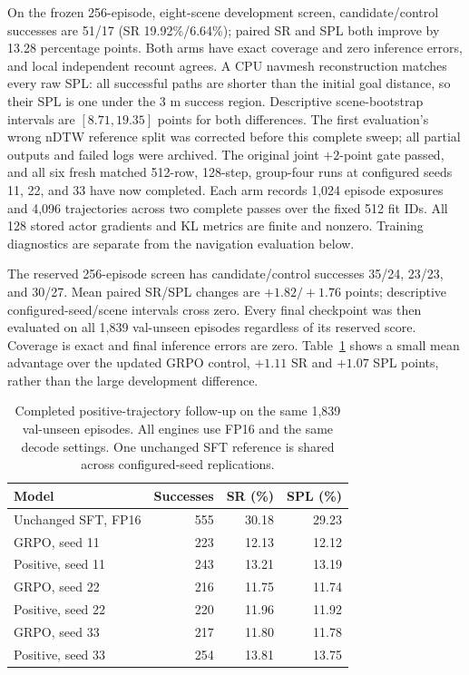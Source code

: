 \documentclass[10pt,twocolumn,letterpaper]{article}
\begin{document}
On the frozen 256-episode, eight-scene development screen, candidate/control
successes are 51/17 (SR 19.92\%/6.64\%); paired SR and SPL both improve
by 13.28 percentage points. Both arms have exact coverage and zero inference
errors, and local independent recount agrees. A CPU navmesh reconstruction
matches every raw SPL: all successful paths are shorter than the initial
goal distance, so their SPL is one under the 3 m success region. Descriptive
scene-bootstrap intervals are $[8.71,19.35]$ points for both differences.
The first evaluation's wrong nDTW reference split was corrected before
this complete sweep; all partial outputs and failed logs were archived.
The original joint $+2$-point gate passed, and all six fresh matched
512-row, 128-step, group-four runs at configured seeds 11, 22, and 33
have now completed. Each arm records 1,024 episode exposures and 4,096
trajectories across two complete passes over the fixed 512 fit IDs.
All 128 stored actor gradients and KL metrics are finite and nonzero.
Training diagnostics are separate from the navigation evaluation below.

The reserved 256-episode screen has candidate/control successes
35/24, 23/23, and 30/27. Mean paired SR/SPL changes are $+1.82/+1.76$
points; descriptive configured-seed/scene intervals cross zero.
Every final checkpoint was then evaluated on all 1,839 val-unseen
episodes regardless of its reserved score. Coverage is exact and final
inference errors are zero. Table~\ref{tab:positive-full} shows a small
mean advantage over the updated GRPO control, $+1.11$ SR and $+1.07$ SPL
points, rather than the large development difference.

\begin{table}[t]
\centering
\small
\begin{tabular}{@{}lrrr@{}}
\toprule
Model & Successes & SR (\%) & SPL (\%) \\
\midrule
Unchanged SFT, FP16 & 555 & 30.18 & 29.23 \\
GRPO, seed 11 & 223 & 12.13 & 12.12 \\
Positive, seed 11 & 243 & 13.21 & 13.19 \\
GRPO, seed 22 & 216 & 11.75 & 11.74 \\
Positive, seed 22 & 220 & 11.96 & 11.92 \\
GRPO, seed 33 & 217 & 11.80 & 11.78 \\
Positive, seed 33 & 254 & 13.81 & 13.75 \\
\bottomrule
\end{tabular}
\caption{Completed positive-trajectory follow-up on the same 1,839
val-unseen episodes. All engines use FP16 and the same decode settings.
One unchanged SFT reference is shared across configured-seed replications.}
\label{tab:positive-full}
\end{table}
\end{document}
